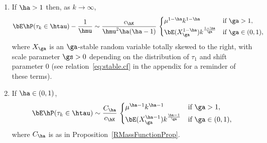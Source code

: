 \begin{lemm}\label{lem:asympt.0}
\begin{enumerate}\romanenumi
\item \label{3.2.1} If $\ha > 1$ then, as $k \to \infty$,
\begin{equation}
\bE \hP (\tau_k \in \htau) - \frac{1}{\hmu} \sim \frac{c_{\hK}}{\hmu^2 \ha (\ha - 1)} \,
\begin{cases}
\mu^{1 - \ha} k^{1 - \ha} & \text{if } \ga > 1,\\[2pt]
\bE(X_\ga^{1 - \ha}) k^{\frac{1 - \ha}{\ga}} & \text{if } \ga \in (0,1),
\end{cases}
\end{equation}
where $X_\ga$ is an $\ga$-stable random variable totally skewed to the right, with scale parameter $\gs > 0$ depending on the distribution of $\tau_1$ and shift parameter $0$ (see relation~\eqref{eq:stable.cf} in the appendix for a reminder of these terms).

\item \label{3.2.2} If $\ha \in (0,1)$,
\begin{equation}
\bE \hP (\tau_k \in \htau) \sim \frac{C_{\ha}}{c_{\hK}} \,
\begin{cases}
\mu^{\ha - 1} k^{\ha - 1} & \text{if } \ga > 1,\\[2pt]
\bE(X_\ga^{\ha - 1}) k^{\frac{\ha - 1}{\ga}} & \text{if } \ga \in (0,1),
\end{cases}
\end{equation}
where $C_{\ha}$ is as in Proposition~\ref{RMassFunctionProp}.
\end{enumerate}
\end{lemm}

